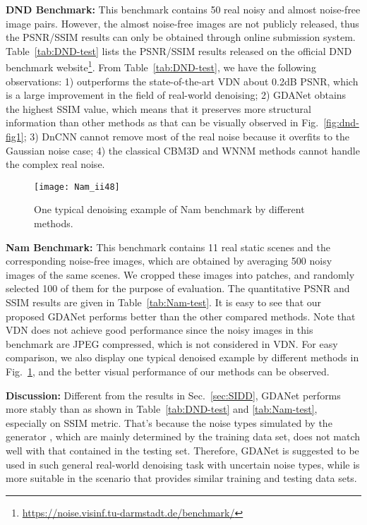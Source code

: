 \documentclass[runningheads]{llncs}
\begin{document}
\vspace{2mm}\noindent\textbf{DND Benchmark:}
This benchmark contains 50 real noisy and almost noise-free image pairs.  However, the almost noise-free images
are not publicly released, thus the PSNR/SSIM results can only be obtained through online submission system.
Table~\ref{tab:DND-test} lists the PSNR/SSIM results released on the official DND benchmark
website\footnote{\url{https://noise.visinf.tu-darmstadt.de/benchmark/}}. From Table~\ref{tab:DND-test}, we have the
following observations: 1)  outperforms the state-of-the-art VDN about 0.2dB PSNR, which is a large
improvement in the field of real-world denoising; 2) GDANet obtains the highest SSIM value, which
means that it preserves more structural information than other methods as that can be visually observed
in Fig.~\ref{fig:dnd-fig1};
3) DnCNN cannot remove most of the real noise because it overfits to the Gaussian noise case;
4) the classical CBM3D and WNNM methods cannot handle the complex real noise.
\begin{figure}[t]
    \centering
    \texttt{[image: Nam\_ii48]}
    \vspace{-6mm}
    \caption{One typical denoising example of Nam benchmark by different methods.} \label{fig:nam-fig1}
\end{figure}

\vspace{2mm}\noindent\textbf{Nam Benchmark:} This benchmark contains 11 real static scenes and the corresponding
noise-free images,
which are obtained by averaging 500 noisy images of the same scenes. We cropped these images into 
patches, and randomly selected 100 of them for the purpose of evaluation.
The quantitative PSNR and SSIM results are given in Table~\ref{tab:Nam-test}. It is easy to see that our proposed GDANet
performs better than the other compared methods.
Note that VDN does not achieve good performance since the noisy images in
this benchmark are JPEG compressed, which is not considered in VDN. For easy comparison, we also display one typical
denoised example by different methods in Fig.~\ref{fig:nam-fig1}, and the better visual performance of our methods
can be observed.

\vspace{2mm}\noindent\textbf{Discussion:} Different from the results in Sec.~\ref{sec:SIDD},
GDANet performs more stably than  
as shown in Table~\ref{tab:DND-test} and \ref{tab:Nam-test}, especially on SSIM metric.
That's because the noise types 
simulated by the generator , which are mainly determined by the training data set, does not match well with that contained in
the testing set. Therefore, GDANet is suggested to be used
in such general real-world denoising task with uncertain noise types, while  is more suitable in the 
scenario that provides similar training and testing data sets.
\end{document}
